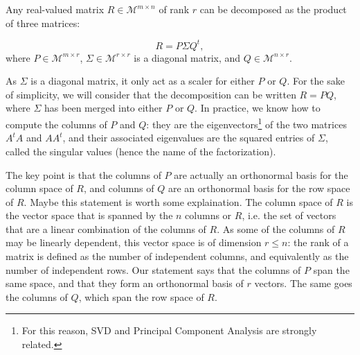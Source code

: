 \begin{proposition}
  Any real-valued matrix $R \in \mathcal{M}^{m \times n}$ of rank $r$ can be
  decomposed as the product of three matrices:

  $$R = P\Sigma Q^t,$$
  where $P\in \mathcal{M}^{m \times r}$, $\Sigma\in \mathcal{M}^{r \times r}$
  is a diagonal matrix, and $Q\in \mathcal{M}^{n \times r}$.
\end{proposition}

As $\Sigma$ is a diagonal matrix, it only act as a scaler for either $P$ or
$Q$. For the sake of simplicity, we will consider that the decomposition can be
written $R = PQ$, where $\Sigma$ has been merged into either $P$ or $Q$. In
practice, we know how to compute the columns of $P$ and $Q$: they are the
eigenvectors\footnote{For this reason, SVD and Principal Component Analysis are
strongly related.} of the two matrices $A^tA$ and $AA^t$, and their associated
eigenvalues are the squared entries of $\Sigma$, called the singular values
(hence the name of the factorization).

The key point is that the columns of $P$ are actually an orthonormal basis for
the column space of $R$, and columns of $Q$ are an orthonormal basis for the
row space of $R$. Maybe this statement is worth some explaination. The column
space of $R$ is the vector space that is spanned by the $n$ columns or $R$,
i.e. the set of vectors that are a linear combination of the columns of $R$. As
some of the columns of $R$ may be linearly dependent, this vector space is of
dimension $r\leq n$: the rank of a matrix is defined as the number of
independent columns, and equivalently as the number of independent rows. Our
statement says that the columns of $P$ span the same space, and that they form
an orthonormal basis of $r$ vectors. The same goes the columns of $Q$, which
span the row space of $R$.

